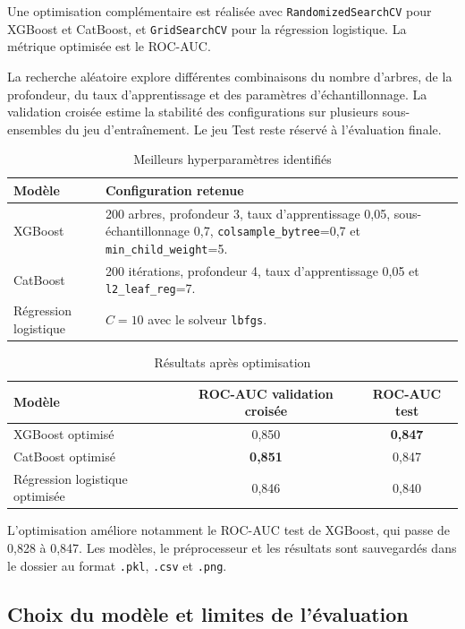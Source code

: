 \documentclass[12pt, a4paper]{article}
\newcommand{\filepath}[1]{\texttt{\detokenize{#1}}}
\begin{document}
Une optimisation complémentaire est réalisée avec
\texttt{RandomizedSearchCV} pour XGBoost et CatBoost, et
\texttt{GridSearchCV} pour la régression logistique. La métrique optimisée est
le ROC-AUC.

La recherche aléatoire explore différentes combinaisons du nombre d'arbres, de
la profondeur, du taux d'apprentissage et des paramètres d'échantillonnage.
La validation croisée estime la stabilité des configurations sur plusieurs
sous-ensembles du jeu d'entraînement. Le jeu Test reste réservé à l'évaluation
finale.

\begin{table}[H]
\centering
\caption{Meilleurs hyperparamètres identifiés}
\begin{tabularx}{\textwidth}{p{}X}
\toprule
\textbf{Modèle} & \textbf{Configuration retenue}\\
\midrule
XGBoost &
200 arbres, profondeur 3, taux d'apprentissage 0,05, sous-échantillonnage
0,7, \texttt{colsample\_bytree}=0,7 et \texttt{min\_child\_weight}=5.\\
CatBoost &
200 itérations, profondeur 4, taux d'apprentissage 0,05 et
\texttt{l2\_leaf\_reg}=7.\\
Régression logistique &
$C=10$ avec le solveur \texttt{lbfgs}.\\
\bottomrule
\end{tabularx}
\end{table}

\begin{table}[H]
\centering
\caption{Résultats après optimisation}
\begin{tabular}{lcc}
\toprule
\textbf{Modèle} & \textbf{ROC-AUC validation croisée} &
\textbf{ROC-AUC test}\\
\midrule
XGBoost optimisé & 0,850 & \textbf{0,847}\\
CatBoost optimisé & \textbf{0,851} & 0,847\\
Régression logistique optimisée & 0,846 & 0,840\\
\bottomrule
\end{tabular}
\end{table}

L'optimisation améliore notamment le ROC-AUC test de XGBoost, qui passe de
0,828 à 0,847. Les modèles, le préprocesseur et les résultats sont sauvegardés
dans le dossier \filepath{models/} au format \texttt{.pkl}, \texttt{.csv} et
\texttt{.png}.

\subsection{Choix du modèle et limites de l'évaluation}
\end{document}

